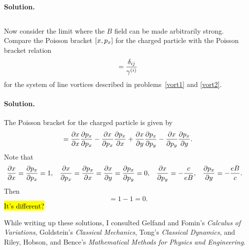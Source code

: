 \documentclass[11pt]{article}
\newcommand{\beq}{\begin{equation*}}
\newcommand{\eeq}{\end{equation*}}
\newenvironment{problem}
{
	\subsection{}
	\color{darkgray}
    \ignorespaces
}
{

}
\newenvironment{solution}
{
    \paragraph{Solution.}
    \ignorespaces
}
{
    \bigskip
}
\begin{document}
\begin{solution}
\end{solution}

\begin{problem}
	Now consider the limit where the $B$ field can be made arbitrarily strong.  Compare the Poisson bracket $[x, p_x]$ for the charged particle with the Poisson bracket relation
	\beq
		[\xi, \yi] = \frac{\delta_{ij}}{\gami}
	\eeq
	for the system of line vortices described in problems~\ref{vort1} and \ref{vort2}.
\end{problem}

\begin{solution}
	The Poisson bracket for the charged particle is given by
	\beq
		[x, \px] = \pdv{x}{x} \pdv{\px}{\px} - \pdv{x}{\px} \pdv{\px}{x} + \pdv{x}{y} \pdv{\px}{\py} - \pdv{x}{\py} \pdv{\px}{y}.
	\eeq
	Note that
	\begin{align*}
		\pdv{x}{x} &= \pdv{p_x}{p_x} = 1, &
		\pdv{x}{p_x} &= \pdv{p_x}{x} = \pdv{x}{y} = \pdv{p_x}{p_y} = 0, &
		\pdv{x}{p_y} &= -\frac{c}{e B}, &
		\pdv{p_x}{y} &= -\frac{e B}{c}.
	\end{align*}
	Then
	\beq
		[x, \px] = 1 - 1 = 0.
	\eeq
	\hl{It's different?}
\end{solution}


\vfill
While writing up these solutions, I consulted Gelfand and Fomin's \emph{Calculus of Variations}, Goldstein's \emph{Classical Mechanics}, Tong's \emph{Classical Dynamics}, and Riley, Hobson, and Bence's \emph{Mathematical Methods for Physics and Engineering}.
\end{document}
